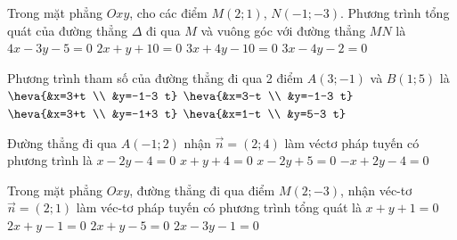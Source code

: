 \begin{ex}%
	Trong mặt phẳng $Oxy$, cho các điểm $M(2;1)$, $N(-1;-3)$. Phương trình tổng quát của  đường thẳng $\Delta$ đi qua $M$ và vuông góc với đường thẳng $MN$ là
	 \choice
		 {$4x-3y-5=0$}
		 {$2x+y+10=0$}
		{\True $3x+4y-10=0$} 
		 {$3x-4y-2=0$}
\end{ex}

\begin{ex}%
	Phương trình tham số  của đường thẳng đi qua 2 điểm $A(3;-1)$ và $B(1; 5)$ là
	 \choice
		{\True  $\heva{&x=3+t \\ &y=-1-3 t}$}
		{$\heva{&x=3-t \\  &y=-1-3 t}$}
		{$\heva{&x=3+t  \\ &y=-1+3 t}$}
		{$\heva{&x=1-t \\  &y=5-3 t}$}
\end{ex}

\begin{ex}%
	Đường thẳng đi qua $A(-1;2)$ nhận $\overrightarrow{n}=(2;4)$ làm véctơ pháp tuyến có phương trình là 
	 \choice
		{$x-2y-4=0$} 
		 {$x+y+4=0$}
		{\True  $x-2y+5=0$}
		 {$-x+2y-4=0$}
\end{ex}

\begin{ex}%
	Trong mặt phẳng $ Oxy$, đường thẳng đi  qua điểm $ M(2;-3)$, nhận véc-tơ $\overrightarrow{n}=\left(2;1\right)$ làm véc-tơ pháp tuyến có phương trình tổng quát là
	\choice 
		 {$ x+y+1=0$}
		{\True  $ 2x+y-1=0$}
		{$  2x+y-5=0$}
		 {$ 2x-3y-1=0$}
\end{ex}

